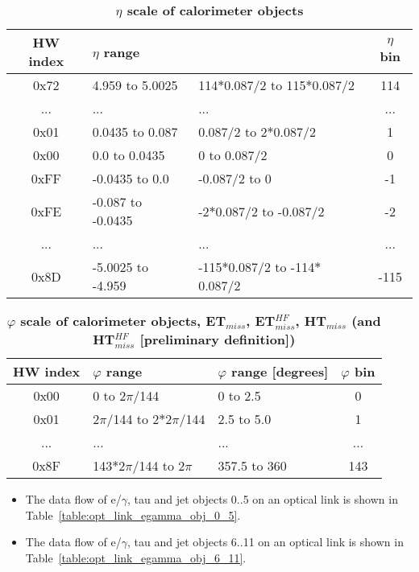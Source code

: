 \documentclass{cmspaper}
\begin{document}
\begin{table}[ht]
\caption{\bf $\eta$ scale of calorimeter objects}
\vspace{5mm}
\centering
\begin{tabular}{|c|l|l|c|}\hline
HW index & $\eta$ range &  & $\eta$ bin \\\hline\hline
0x72 & 4.959 to 5.0025 & 114$*$0.087/2 to 115$*$0.087/2 & 114\\\hline
... & ... & ... & ...\\\hline
0x01 & 0.0435 to 0.087 & 0.087/2 to 2$*$0.087/2 & 1\\\hline
0x00 & 0.0 to 0.0435 & 0 to 0.087/2 & 0\\\hline
0xFF & -0.0435 to 0.0 & -0.087/2 to 0 & -1\\\hline
0xFE & -0.087 to -0.0435  & -2$*$0.087/2 to -0.087/2 & -2\\\hline
... & ... & ... & ...\\\hline
0x8D & -5.0025 to -4.959 & -115$*$0.087/2 to -114$*$0.087/2 & -115\\\hline
\end{tabular}
\label{table:calo_eta_scale}
\end{table}

\begin{table}[ht]
\caption{\bf $\varphi$ scale of calorimeter objects, ET$_{miss}$, ET$_{miss}^{HF}$, HT$_{miss}$ (and HT$_{miss}^{HF}$ [preliminary definition])}
\vspace{5mm}
\centering
\begin{tabular}{|c|l|l|c|}\hline
HW index & $\varphi$ range & $\varphi$ range [degrees] & $\varphi$ bin\\\hline\hline
0x00 & 0 to 2$\pi$/144 & 0 to 2.5 & 0\\\hline
0x01 & 2$\pi$/144 to 2$*$2$\pi$/144 & 2.5 to 5.0 & 1\\\hline
... & ... & ... & ...\\\hline
0x8F & 143$*$2$\pi$/144 to 2$\pi$ & 357.5 to 360 & 143\\\hline
\end{tabular}
\label{table:calo_phi_scale}
\end{table}

\clearpage

\begin{itemize}
\item The data flow of e/$\gamma$, tau and jet objects 0..5 on an optical link is shown in Table~\ref{table:opt_link_egamma_obj_0_5}.
\item The data flow of e/$\gamma$, tau and jet objects 6..11 on an optical link is shown in Table~\ref{table:opt_link_egamma_obj_6_11}.
\end{itemize}
\end{document}
